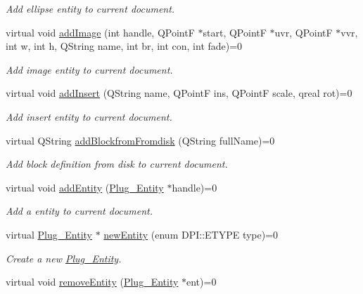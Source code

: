 \begin{DoxyCompactItemize}
\begin{DoxyCompactList}\small\item\em Add ellipse entity to current document. \end{DoxyCompactList}\item 
virtual void \hyperlink{classDocument__Interface_ab532bc55dd8b33c2227d69ae8c894745}{add\-Image} (int handle, Q\-Point\-F $\ast$start, Q\-Point\-F $\ast$uvr, Q\-Point\-F $\ast$vvr, int w, int h, Q\-String name, int br, int con, int fade)=0
\begin{DoxyCompactList}\small\item\em Add image entity to current document. \end{DoxyCompactList}\item 
virtual void \hyperlink{classDocument__Interface_a8fc4d5baa0da4cc370d7eea9fc0bd4d0}{add\-Insert} (Q\-String name, Q\-Point\-F ins, Q\-Point\-F scale, qreal rot)=0
\begin{DoxyCompactList}\small\item\em Add insert entity to current document. \end{DoxyCompactList}\item 
virtual Q\-String \hyperlink{classDocument__Interface_a93286c29f88075a355b306e10c9990c1}{add\-Blockfrom\-Fromdisk} (Q\-String full\-Name)=0
\begin{DoxyCompactList}\small\item\em Add block definition from disk to current document. \end{DoxyCompactList}\item 
virtual void \hyperlink{classDocument__Interface_a16cac3caee5861d7081ba71e30a1e4f6}{add\-Entity} (\hyperlink{classPlug__Entity}{Plug\-\_\-\-Entity} $\ast$handle)=0
\begin{DoxyCompactList}\small\item\em Add a entity to current document. \end{DoxyCompactList}\item 
virtual \hyperlink{classPlug__Entity}{Plug\-\_\-\-Entity} $\ast$ \hyperlink{classDocument__Interface_a0c9f39bc44101e4015473d3b0645607b}{new\-Entity} (enum D\-P\-I\-::\-E\-T\-Y\-P\-E type)=0
\begin{DoxyCompactList}\small\item\em Create a new \hyperlink{classPlug__Entity}{Plug\-\_\-\-Entity}. \end{DoxyCompactList}\item 
virtual void \hyperlink{classDocument__Interface_a6613bc65057cb7f7daa18b91cf6850a6}{remove\-Entity} (\hyperlink{classPlug__Entity}{Plug\-\_\-\-Entity} $\ast$ent)=0

\end{DoxyCompactItemize}
